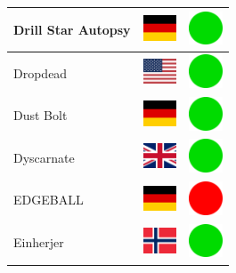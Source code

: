 \documentclass[12pt, a4paper, twoside]{report}
\begin{document}
\begin{center}
\begin{longtable}{|p{5cm}|p{2cm}|p{2cm}|}
 Drill Star Autopsy                                         & \includegraphics[width=1cm]{../4x3/de} &   \includegraphics[width=1cm]{../likes/y} \\ \hline
 Dropdead                                                   & \includegraphics[width=1cm]{../4x3/us} &   \includegraphics[width=1cm]{../likes/y} \\ \hline
 Dust Bolt                                                  & \includegraphics[width=1cm]{../4x3/de} &   \includegraphics[width=1cm]{../likes/y} \\ \hline
 Dyscarnate                                                 & \includegraphics[width=1cm]{../4x3/gb} &   \includegraphics[width=1cm]{../likes/y} \\ \hline
 EDGEBALL                                                   & \includegraphics[width=1cm]{../4x3/de} &   \includegraphics[width=1cm]{../likes/n} \\ \hline
 Einherjer                                                  & \includegraphics[width=1cm]{../4x3/no} &   \includegraphics[width=1cm]{../likes/y} \\ \hline

\end{longtable}
\end{center}
\end{document}
